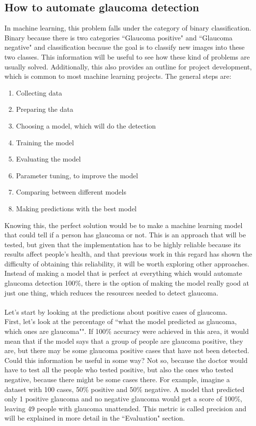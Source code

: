 \documentclass[11pt, a4paper]{article}
\begin{document}
\subsection{How to automate glaucoma detection}
In machine learning, this problem falls under the category of binary classification. Binary because there is two categories ``Glaucoma positive" and ``Glaucoma negative" and classification because the goal is to classify new images into these two classes. This information will be useful to see how these kind of problems are usually solved. Additionally, this also provides an outline for project development, which is common to most machine learning projects. The general steps are:
\begin{enumerate}
  \item Collecting data
  \item Preparing the data
  \item Choosing a model, which will do the detection
  \item Training the model
  \item Evaluating the model
  \item Parameter tuning, to improve the model
  \item Comparing between different models
  \item Making predictions with the best model
\end{enumerate}
Knowing this, the perfect solution would be to make a machine learning model that could tell if a person has glaucoma or not. This is an approach that will be tested, but given that the implementation has to be highly reliable because its results affect people's health, and that previous work in this regard has shown the difficulty of obtaining this reliability, it will be worth exploring other approaches. Instead of making a model that is perfect at everything which would automate glaucoma detection 100\%, there is the option of making the model really good at just one thing, which reduces the resources needed to detect glaucoma.
\\
\\
Let's start by looking at the predictions about positive cases of glaucoma.
\\
First, let's look at the percentage of ``what the model predicted as glaucoma, which ones are glaucoma"". If 100\% accuracy were achieved in this area, it would mean that if the model says that a group of people are glaucoma positive, they are, but there may be some glaucoma positive cases that have not been detected. Could this information be useful in some way? Not so, because the doctor would have to test all the people who tested positive, but also the ones who tested negative, because there might be some cases there. For example, imagine a dataset with 100 cases, 50\% positive and 50\% negative. A model that predicted only 1 positive glaucoma and no negative glaucoma would get a score of 100\%, leaving 49 people with glaucoma unattended. This metric is called precision and will be explained in more detail in the ``Evaluation" section.
\end{document}
